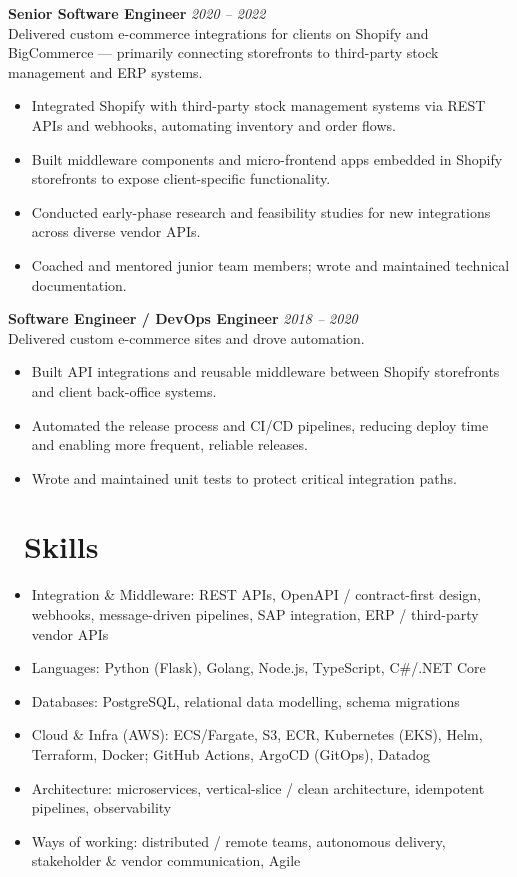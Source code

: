 \documentclass{resume}
\begin{document}
\vspace{1em}
\textbf{Senior Software Engineer} \hfill \textit{2020 -- 2022} \\
Delivered custom e-commerce integrations for clients on Shopify and BigCommerce — primarily connecting storefronts to third-party stock management and ERP systems.
\begin{itemize}
  \item Integrated Shopify with third-party stock management systems via REST APIs and webhooks, automating inventory and order flows.
  \item Built middleware components and micro-frontend apps embedded in Shopify storefronts to expose client-specific functionality.
  \item Conducted early-phase research and feasibility studies for new integrations across diverse vendor APIs.
  \item Coached and mentored junior team members; wrote and maintained technical documentation.
\end{itemize}

\vspace{1em}

\textbf{Software Engineer / DevOps Engineer} \hfill \textit{2018 -- 2020} \\
Delivered custom e-commerce sites and drove automation.
\begin{itemize}
  \item Built API integrations and reusable middleware between Shopify storefronts and client back-office systems.
  \item Automated the release process and CI/CD pipelines, reducing deploy time and enabling more frequent, reliable releases.
  \item Wrote and maintained unit tests to protect critical integration paths.
\end{itemize}


\section{\faCogs\ Skills}
\begin{itemize}[parsep=0.5ex]
  \item Integration \& Middleware: REST APIs, OpenAPI / contract-first design, webhooks, message-driven pipelines, SAP integration, ERP / third-party vendor APIs
  \item Languages: Python (Flask), Golang, Node.js, TypeScript, C\#/.NET Core
  \item Databases: PostgreSQL, relational data modelling, schema migrations
  \item Cloud \& Infra (AWS): ECS/Fargate, S3, ECR, Kubernetes (EKS), Helm, Terraform, Docker; GitHub Actions, ArgoCD (GitOps), Datadog
  \item Architecture: microservices, vertical-slice / clean architecture, idempotent pipelines, observability
  \item Ways of working: distributed / remote teams, autonomous delivery, stakeholder \& vendor communication, Agile
\end{itemize}
\end{document}
